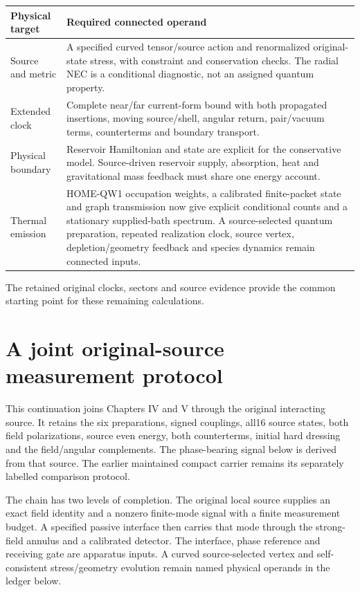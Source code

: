 \documentclass[10pt,twocolumn,letterpaper]{article}
\begin{document}
\begin{center}\small
\begin{tabularx}{\columnwidth}{@{}p{}X@{}}
\toprule
Physical target & Required connected operand\\\midrule
Source and metric & A specified curved tensor/source action and renormalized original-state stress, with constraint and conservation checks. The radial NEC is a conditional diagnostic, not an assigned quantum property.\\
Extended clock & Complete near/far current-form bound with both propagated insertions, moving source/shell, angular return, pair/vacuum terms, counterterms and boundary transport.\\
Physical boundary & Reservoir Hamiltonian and state are explicit for the conservative model. Source-driven reservoir supply, absorption, heat and gravitational mass feedback must share one energy account.\\
Thermal emission & HOME-QW1 occupation weights, a calibrated finite-packet state and graph transmission now give explicit conditional counts and a stationary supplied-bath spectrum. A source-selected quantum preparation, repeated realization clock, source vertex, depletion/geometry feedback and species dynamics remain connected inputs.\\\bottomrule
\end{tabularx}
\end{center}
The retained original clocks, sectors and source evidence provide the
common starting point for these remaining calculations.



\clearpage
\section{A joint original-source measurement protocol}
\label{sec:joint-measurement}
This continuation joins Chapters IV and V through the original interacting
source. It retains the six preparations, signed couplings, all16 source
states, both field polarizations, source even energy, both counterterms,
initial hard dressing and the field/angular complements. The phase-bearing
signal below is derived from that source. The earlier maintained compact
carrier remains its separately labelled comparison protocol.

The chain has two levels of completion. The original local source supplies
an exact field identity and a nonzero finite-mode signal with a finite
measurement budget. A specified passive interface then carries that mode
through the strong-field annulus and a calibrated detector. The interface,
phase reference and receiving gate are apparatus inputs. A curved
source-selected vertex and self-consistent stress/geometry evolution
remain named physical operands in the ledger below.
\end{document}
